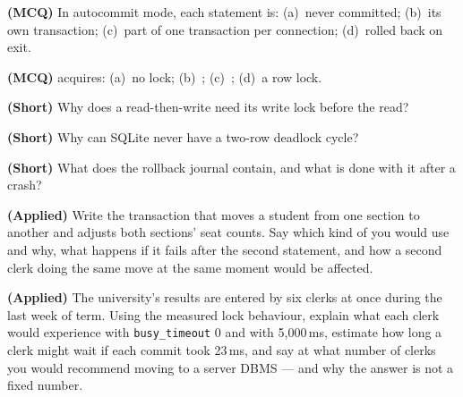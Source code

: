 \begin{reviewq}
  \item \textbf{(MCQ)} In autocommit mode, each statement is: (a)~never
        committed; (b)~its own transaction; (c)~part of one transaction per
        connection; (d)~rolled back on exit.
  \item \textbf{(MCQ)}  acquires: (a)~no lock;
        (b)~; (c)~; (d)~a row lock.
  \item \textbf{(Short)} Why does a read-then-write need its write lock before
        the read?
  \item \textbf{(Short)} Why can SQLite never have a two-row deadlock cycle?
  \item \textbf{(Short)} What does the rollback journal contain, and what is
        done with it after a crash?
  \item \textbf{(Applied)} Write the transaction that moves a student from one
        section to another and adjusts both sections' seat counts. Say which
        kind of  you would use and why, what happens if it fails
        after the second statement, and how a second clerk doing the same move
        at the same moment would be affected.
  \item \textbf{(Applied)} The university's results are entered by six clerks
        at once during the last week of term. Using the measured lock
        behaviour, explain what each clerk would experience with
        \texttt{busy\_timeout} 0 and with 5{,}000\,ms, estimate how long a
        clerk might wait if each commit took 23\,ms, and say at what number of
        clerks you would recommend moving to a server DBMS --- and why the
        answer is not a fixed number.
\end{reviewq}
